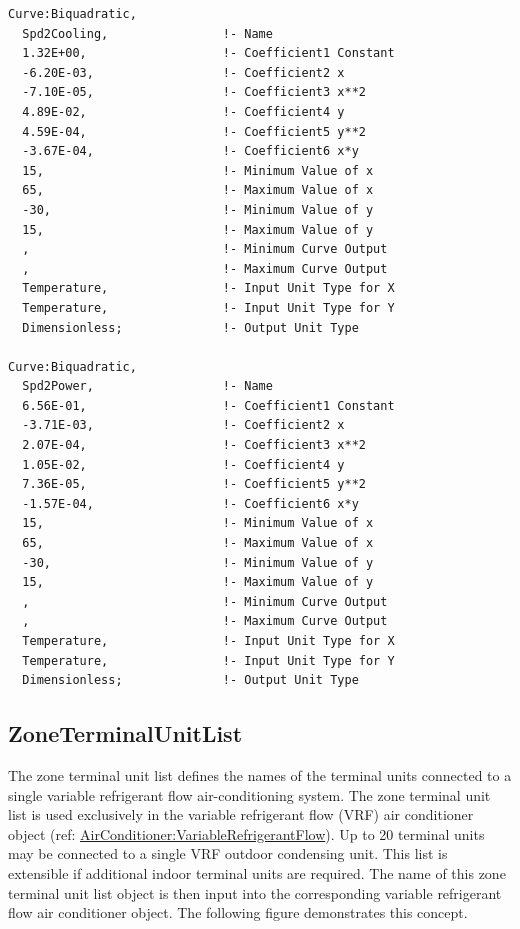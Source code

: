 \begin{lstlisting}
Curve:Biquadratic,
  Spd2Cooling,                !- Name
  1.32E+00,                   !- Coefficient1 Constant
  -6.20E-03,                  !- Coefficient2 x
  -7.10E-05,                  !- Coefficient3 x**2
  4.89E-02,                   !- Coefficient4 y
  4.59E-04,                   !- Coefficient5 y**2
  -3.67E-04,                  !- Coefficient6 x*y
  15,                         !- Minimum Value of x
  65,                         !- Maximum Value of x
  -30,                        !- Minimum Value of y
  15,                         !- Maximum Value of y
  ,                           !- Minimum Curve Output
  ,                           !- Maximum Curve Output
  Temperature,                !- Input Unit Type for X
  Temperature,                !- Input Unit Type for Y
  Dimensionless;              !- Output Unit Type

Curve:Biquadratic,
  Spd2Power,                  !- Name
  6.56E-01,                   !- Coefficient1 Constant
  -3.71E-03,                  !- Coefficient2 x
  2.07E-04,                   !- Coefficient3 x**2
  1.05E-02,                   !- Coefficient4 y
  7.36E-05,                   !- Coefficient5 y**2
  -1.57E-04,                  !- Coefficient6 x*y
  15,                         !- Minimum Value of x
  65,                         !- Maximum Value of x
  -30,                        !- Minimum Value of y
  15,                         !- Maximum Value of y
  ,                           !- Minimum Curve Output
  ,                           !- Maximum Curve Output
  Temperature,                !- Input Unit Type for X
  Temperature,                !- Input Unit Type for Y
  Dimensionless;              !- Output Unit Type
\end{lstlisting}

\subsection{ZoneTerminalUnitList}\label{zoneterminalunitlist}

The zone terminal unit list defines the names of the terminal units connected to a single variable refrigerant flow air-conditioning system. The zone terminal unit list is used exclusively in the variable refrigerant flow (VRF) air conditioner object (ref: \hyperref[airconditionervariablerefrigerantflow]{AirConditioner:VariableRefrigerantFlow}). Up to 20 terminal units may be connected to a single VRF outdoor condensing unit. This list is extensible if additional indoor terminal units are required. The name of this zone terminal unit list object is then input into the corresponding variable refrigerant flow air conditioner object. The following figure demonstrates this concept.

